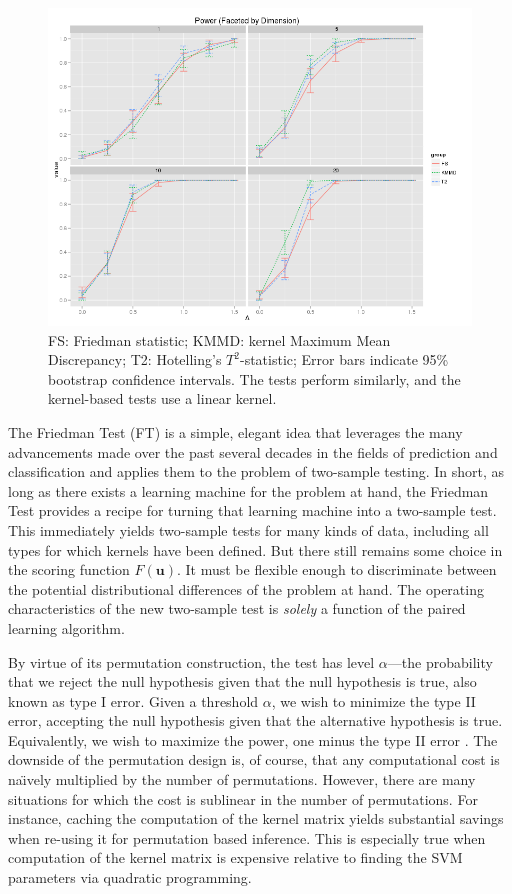 \begin{figure}
  \centering
  \includegraphics[width=\linewidth]{power_normal.png}
  \caption{FS: Friedman statistic; KMMD: kernel Maximum Mean
    Discrepancy; T2: Hotelling's $T^2$-statistic; Error bars indicate
    95\% bootstrap confidence intervals.  The tests perform similarly,
    and the kernel-based tests use a linear kernel.}
  \label{fig:power_normal}
\end{figure}

The Friedman Test (FT) is a simple, elegant idea that leverages the
many advancements made over the past several decades in the fields of
prediction and classification and applies them to the problem of
two-sample testing.  In short, as long as there exists a learning
machine for the problem at hand, the Friedman Test provides a recipe
for turning that learning machine into a two-sample test.  This
immediately yields two-sample tests for many kinds of data, including
all types for which kernels have been defined.
But there still remains some choice in the scoring
function $F(\mathbf{u})$.  It must be flexible enough to discriminate
between the potential distributional differences of the problem at
hand.  The operating characteristics of the new two-sample test is
\emph{solely} a function of the paired learning algorithm.

By virtue of its permutation construction, the test has level $\alpha$---the
probability that we reject the null hypothesis given
that the null hypothesis is true, also known as type I error.  Given a
threshold $\alpha$, we wish to minimize the type II error, accepting
the null hypothesis given that the alternative hypothesis is true.
Equivalently, we wish to maximize the power, one minus the type II
error \cite{lehmann2005testing}.  The downside of the permutation
design is, of course, that any computational cost is na\"\i vely
multiplied by the number of permutations.  However, there are many
situations for which the cost is sublinear in the number of
permutations.  For instance, caching the computation of the kernel matrix
yields substantial savings when re-using it for permutation based
inference.  This is especially true when computation of the kernel
matrix is expensive relative to finding the SVM parameters via
quadratic programming.

